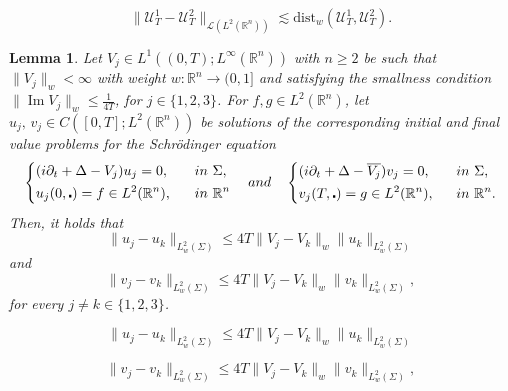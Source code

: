 \documentclass[10pt,a4paper]{amsart}
\newtheorem{lemma}{Lemma}
\def\Im{\mathop\mathrm{Im}}
\newcommand{\R}{\mathbb{R}}
\def\cal{\mathcal}
\def\cd{\centerdot}
\def\d{\partial}
\newcommand{\dist}{\mathrm{dist}}
\def\lec{\lesssim}
\def\ovl{\overline}
\begin{document}
\begin{equation}\label{eq: bound_IF_map_distance}
	\|\cal{U}_T^1 - \cal{U}^2_T\|_{\cal{L}(L^2(\R^n))} \lec \dist_{w}(\cal{U}_T^1, \cal{U}_T^2). 
\end{equation}

\begin{lemma}\label{lem: closeness_of_solutions_time}
Let $V_j\in L^1((0, T); L^\infty(\R^n))$ with $n\geq 2$ be such that $\| V_j \|_{w}< \infty$ with weight $w:\R^n \to (0,1]$ and satisfying the smallness condition $\|  \Im V_j \|_{w} \leq \frac{1}{4T} $, for $j\in\{1,2,3\}$.
For $f,g\in L^2(\R^n)$, let $u_j, \, v_j \in C([0, T]; L^2(\R^n))$ be solutions of the corresponding initial and final value problems for the Schr\"odinger equation
%
\[
\begin{dcases}
(i\d_t+\Delta - V_j)u_j = 0, \quad &\textup{in}\,\, \Sigma, \\
u_j(0, \cd) = f \in L^2(\R^n), &\textup{in}\,\, \R^n
\end{dcases} 
%
\quad \textup{and} \quad
%
\begin{dcases}
(i\d_t+\Delta - \ovl{V_j})v_j = 0, \quad &\textup{in}\,\, \Sigma, \\
v_j(T, \cd) = g\in L^2(\R^n), &\textup{in}\,\, \R^n.
\end{dcases} 
\]
%
Then, it holds that 
%
\begin{equation}\label{eq: solutions_diff1_time}
\|u_j - u_k \|_{L^2_w(\Sigma)} \leq 4T \| V_j - V_k \|_{w} \|u_k\|_{L^2_w(\Sigma)}
\end{equation}
%
and
%
\begin{equation}\label{eq: solutions_diff2_time}
\|v_j - v_k \|_{L^2_w(\Sigma)} \leq 4T \| V_j - V_k \|_{w} \|v_k\|_{L^2_w(\Sigma)},
\end{equation}
%
for every $j \neq k \in \{1, 2, 3 \}$.
\end{lemma}

\begin{equation}
\|u_j - u_k \|_{L^2_w(\Sigma)} \leq 4T \| V_j - V_k \|_{w} \|u_k\|_{L^2_w(\Sigma)}
\end{equation}

\begin{equation}
\|v_j - v_k \|_{L^2_w(\Sigma)} \leq 4T \| V_j - V_k \|_{w} \|v_k\|_{L^2_w(\Sigma)},
\end{equation}
\end{document}
